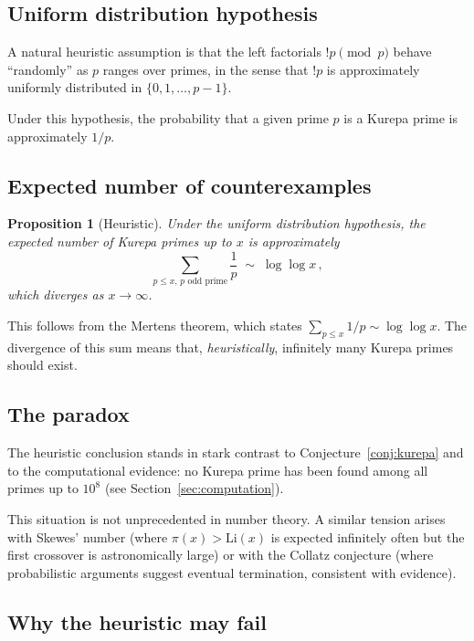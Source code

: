 \documentclass[12pt,a4paper]{amsart}
\newtheorem{proposition}[theorem]{Proposition}
\theoremstyle{definition}
\begin{document}
\subsection{Uniform distribution hypothesis}

A natural heuristic assumption is that the left factorials $!p \pmod p$
behave ``randomly'' as $p$ ranges over primes, in the sense that $!p$ is
approximately uniformly distributed in $\{0, 1, \ldots, p-1\}$.

Under this hypothesis, the probability that a given prime $p$ is a Kurepa
prime is approximately $1/p$.

\subsection{Expected number of counterexamples}

\begin{proposition}[Heuristic]
Under the uniform distribution hypothesis, the expected number of Kurepa
primes up to $x$ is approximately
\[
  \sum_{p \leq x,\, p \text{ odd prime}} \frac{1}{p} \;\sim\; \log\log x\,,
\]
which diverges as $x \to \infty$.
\end{proposition}

This follows from the Mertens theorem, which states
$\sum_{p \leq x} 1/p \sim \log\log x$.
The divergence of this sum means that, \emph{heuristically}, infinitely many
Kurepa primes should exist.

\subsection{The paradox}

The heuristic conclusion stands in stark contrast to Conjecture~\ref{conj:kurepa}
and to the computational evidence: no Kurepa prime has been found among
all primes up to $10^8$ (see Section~\ref{sec:computation}).

This situation is not unprecedented in number theory.
A similar tension arises with Skewes' number (where $\pi(x) > \mathrm{Li}(x)$
is expected infinitely often but the first crossover is astronomically large)
or with the Collatz conjecture (where probabilistic arguments suggest eventual
termination, consistent with evidence).

\subsection{Why the heuristic may fail}
\end{document}
